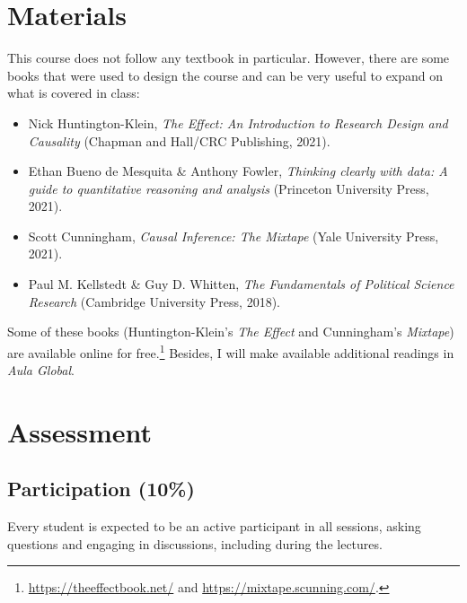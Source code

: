 \documentclass[12pt, a4paper]{article}
\begin{document}
\section{Materials}

This course does not follow any textbook in particular.
However, there are some books that were used to design the course and can be very useful to expand on what is covered in class:

\begin{itemize}
\setlength\itemsep{-5pt}
  \item Nick Huntington-Klein, \textit{The Effect: An Introduction to Research Design and Causality} (Chapman and Hall/CRC Publishing, 2021).
  \item Ethan Bueno de Mesquita \& Anthony Fowler, \textit{Thinking clearly with data: A guide to quantitative reasoning and analysis} (Princeton University Press, 2021).
  \item Scott Cunningham, \textit{Causal Inference: The Mixtape} (Yale University Press, 2021).
  \item Paul M. Kellstedt \& Guy D. Whitten, \textit{The Fundamentals of Political Science Research} (Cambridge University Press, 2018).
\end{itemize}

Some of these books (Huntington-Klein's \textit{The Effect} and Cunningham's \textit{Mixtape}) are available online for free.\footnote{\url{https://theeffectbook.net/} and \url{https://mixtape.scunning.com/}.} Besides, I will make available additional readings in \textit{Aula Global}.

\section{Assessment}


\subsection*{Participation (10\%)}

Every student is expected to be an active participant in all sessions, asking questions and engaging in discussions, including during the lectures.
\end{document}
